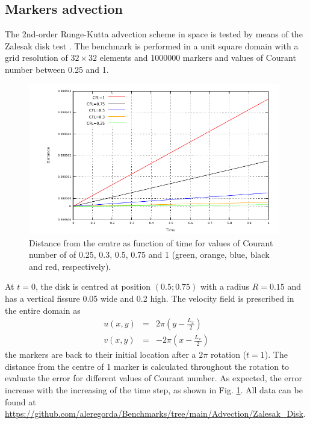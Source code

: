 \subsection{Markers advection}\label{sec:runge}
The 2nd-order Runge-Kutta advection scheme in space is tested by means of the Zalesak disk test \citep{Zalesak1979,Thieulot2014}. The benchmark is performed
in a unit square domain with a grid resolution of $32\times32$ elements and 1000000 markers and values of Courant number between 0.25 and 1.

\begin{figure}
\includegraphics[width=11cm]{./Figures/zal_marker.pdf}
\caption{Distance from the centre as function of time for values of Courant number of  of 0.25, 0.3, 0.5, 0.75 and 1 (green, orange, blue, black and red,
respectively).}
\label{fig:runge_err}
\end{figure}
At $t=0$, the disk is centred at position $(0.5;0.75)$ with a radius $R=0.15$ and has a vertical fissure 0.05 wide and 0.2 high.%
The velocity field is prescribed in the entire domain as
\begin{eqnarray}
u(x,y)&=&2\pi\left(y-\frac{L_x}{2}\right)\nonumber \\
v(x,y)&=&-2\pi\left(x-\frac{L_x}{2}\right)\nonumber
\end{eqnarray}
the markers are back to their initial location after a $2\pi$ rotation ($t=1$).
The distance from the centre of 1 marker is calculated throughout the rotation to
evaluate the error for different values of Courant number. As expected, the error increase with the increasing of the time step, as shown in 
Fig. \ref{fig:runge_err}. 
All data can be found at \url{https://github.com/aleregorda/Benchmarks/tree/main/Advection/Zalesak_Disk}.
